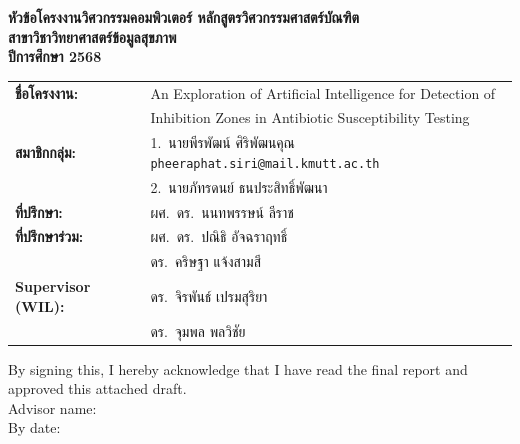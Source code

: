 \documentclass[12pt,a4paper,oneside]{report}
\begin{document}
\begin{titlepage}
  \thispagestyle{empty}
  \centering

  {\large\bfseries หัวข้อโครงงานวิศวกรรมคอมพิวเตอร์ หลักสูตรวิศวกรรมศาสตร์บัณฑิต}\\[0.1cm]
  {\large\bfseries สาขาวิชาวิทยาศาสตร์ข้อมูลสุขภาพ}\\[0.1cm]
  {\large\bfseries ปีการศึกษา 2568}\\[1.2cm]

  \begin{tabular}{@{}lp{10cm}@{}}
    \textbf{ชื่อโครงงาน:} &
      An Exploration of Artificial Intelligence for Detection of \\
    & Inhibition Zones in Antibiotic Susceptibility Testing \\[0.8cm]
    \textbf{สมาชิกกลุ่ม:} &
      1.\ นายพีรพัฒน์ ศิริพัฒนคุณ \quad 65070505214
      \quad \texttt{pheeraphat.siri@mail.kmutt.ac.th} \\[0.2cm]
    & 2.\ นายภัทรดนย์ ธนประสิทธิ์พัฒนา \quad 65070505223 \\[0.8cm]
    \textbf{ที่ปรึกษา:}    & ผศ.\ ดร.\ นนทพรรษน์ ลีราช \\[0.3cm]
    \textbf{ที่ปรึกษาร่วม:} & ผศ.\ ดร.\ ปณิธิ อัจฉราฤทธิ์ \\[0.2cm]
    & ดร.\ คริษฐา แจ้งสามสี \\[0.3cm]
    \textbf{Supervisor (WIL):} & ดร.\ จิรพันธ์ เปรมสุริยา \\[0.2cm]
    & ดร.\ จุมพล พลวิชัย \\[1.5cm]
  \end{tabular}

  \vfill
  \begin{flushleft}
  By signing this, I hereby acknowledge that I have read the final report
  and approved this attached draft.\\[1.8cm]
  Advisor name:\ \underline{\hspace{8cm}}\\[1cm]
  By date:\ \underline{\hspace{8.7cm}}
  \end{flushleft}
\end{titlepage}
\end{document}
